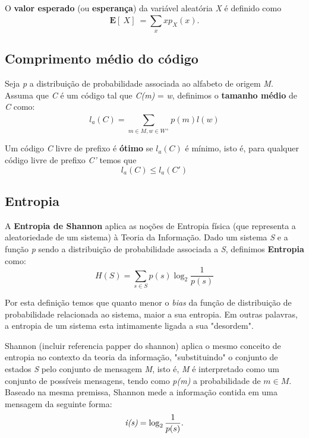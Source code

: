 O \textbf{valor esperado} (ou \textbf{esperança}) da variável aleatória \emph{X} é definido como
\begin{equation} \label{eq:exp_val}
\textbf{E}[\ X]\ = \sum_{x}^{} xp_X(x).
\end{equation}

\subsection{Comprimento médio do código}
Seja \emph{p} a distribuição de probabilidade associada ao alfabeto de origem \emph{M}. Assuma que \emph{C} é um código tal que \emph{C(m)} = \emph{w}, definimos o \textbf{tamanho médio} de \emph{C} como:
\begin{equation} \label{eq:code_len}
l_a (C) = \sum_{m \in M, w \in W^+}^{} p(m) l(w)
\end{equation}

Um código \emph{C} livre de prefixo é \textbf{ótimo} se $l_a(C)$ é mínimo, isto é, para qualquer código livre de prefixo \emph{C'} temos que
\begin{equation} \label{eq:code_len_optimal}
l_a(C) \leq l_a(C')
\end{equation}

\subsection{Entropia}
A \textbf{Entropia de Shannon} aplica as noções de Entropia física (que representa a aleatoriedade de um sistema) à Teoria da Informação. Dado um sistema \emph{S} e a função \emph{p} sendo a distribuição de probabilidade associada a \emph{S}, definimos \textbf{Entropia} como:
\begin{equation} \label{eq:entropy}
H(S) = \sum_{s \in S}^{} p(s) \log_2 \frac{1}{p(s)}
\end{equation}

Por esta definição temos que quanto menor o \emph{bias} da função de distribuição de probabilidade relacionada ao sistema, maior a sua entropia. Em outras palavras, a entropia de um sistema esta intimamente ligada a sua  "desordem". 

Shannon (incluir referencia papper do shannon) aplica o mesmo conceito de entropia no contexto da teoria da informação, "substituindo" o conjunto de estados \emph{S} pelo conjunto de mensagem \emph{M}, isto é, \emph{M} é interpretado como um conjunto de possíveis mensagens, tendo como \emph{p(m)} a probabilidade de $m \in M$.
Baseado na mesma premissa, Shannon mede a informação contida em uma mensagem da seguinte forma:
\begin{equation} \label{label:info_quantity}
\emph{i(s)} = \log_2 \frac{1}{p(s)}.
\end{equation}

